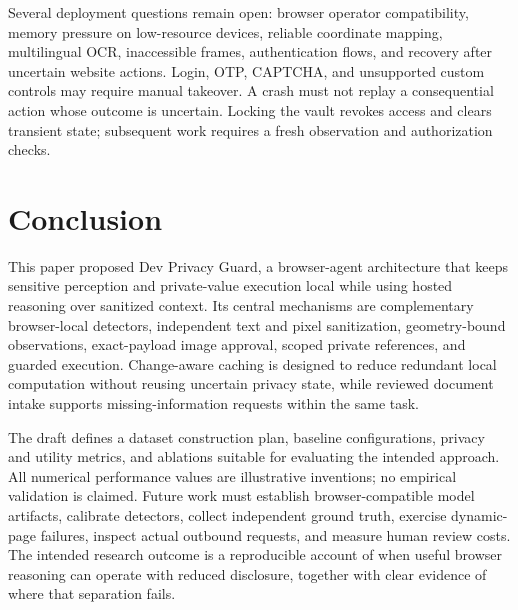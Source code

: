\documentclass[conference]{IEEEtran}
\newcommand{\sys}{Dev Privacy Guard}
\begin{document}
Several deployment questions remain open: browser operator compatibility, memory pressure on low-resource devices, reliable coordinate mapping, multilingual OCR, inaccessible frames, authentication flows, and recovery after uncertain website actions. Login, OTP, CAPTCHA, and unsupported custom controls may require manual takeover. A crash must not replay a consequential action whose outcome is uncertain. Locking the vault revokes access and clears transient state; subsequent work requires a fresh observation and authorization checks.



\section*{Conclusion}
This paper proposed \sys, a browser-agent architecture that keeps sensitive perception and private-value execution local while using hosted reasoning over sanitized context. Its central mechanisms are complementary browser-local detectors, independent text and pixel sanitization, geometry-bound observations, exact-payload image approval, scoped private references, and guarded execution. Change-aware caching is designed to reduce redundant local computation without reusing uncertain privacy state, while reviewed document intake supports missing-information requests within the same task.

The draft defines a dataset construction plan, baseline configurations, privacy and utility metrics, and ablations suitable for evaluating the intended approach. All numerical performance values are illustrative inventions; no empirical validation is claimed. Future work must establish browser-compatible model artifacts, calibrate detectors, collect independent ground truth, exercise dynamic-page failures, inspect actual outbound requests, and measure human review costs. The intended research outcome is a reproducible account of when useful browser reasoning can operate with reduced disclosure, together with clear evidence of where that separation fails.
\end{document}
